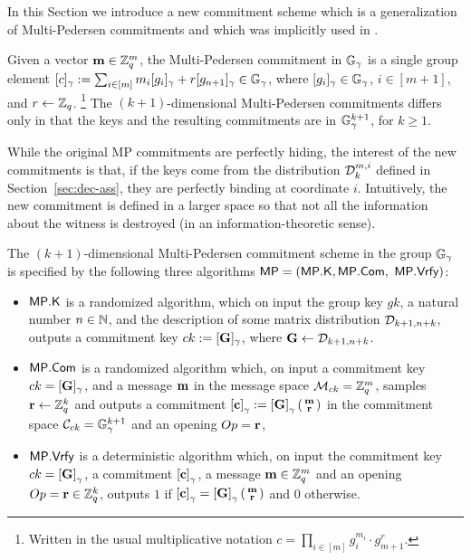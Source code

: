 In this Section we introduce a new commitment scheme which is a generalization of Multi-Pedersen commitments and which was implicitly used in \cite{AC:GonHevRaf15}. 

Given a vector $\mathbf{m}\in\mathbb{Z}_q^m$, the Multi-Pedersen commitment in $\mathbb{G}_{\gamma}$ is a single group element $[c]_\gamma:=\sum_{i\in [m]} m_i[g_i]_\gamma+r[g_{n+1}]_\gamma \in\mathbb{G}_\gamma$, where $[g_i]_{\gamma}\in\mathbb{G}_\gamma$, $i\in[m+1]$, and $r\gets\mathbb{Z}_q$. \footnote{Written in the usual multiplicative notation $c=\prod_{i\in[m]}g_i^{m_i} \cdot g_{m+1}^r$.}  The $(k+1)$-dimensional Multi-Pedersen commitments 
differs only in that the keys and the resulting commitments are in 
$\mathbb{G}_{\gamma}^{k+1}$, for $k\geq 1$. 


While the original MP commitments are perfectly hiding, the interest of the new commitments is that, if the keys come from the distribution $\mathcal{D}_k^{m,i}$ defined in Section~\ref{sec:dec-ass}, they are perfectly binding at coordinate $i$. Intuitively, the new commitment is defined in a larger space so that not all the information about the witness is destroyed (in an information-theoretic sense). 

\begin{definition} The $(k+1)$-dimensional Multi-Pedersen commitment scheme in the group $\mathbb{G}_\gamma$ 
is specified by the following three algorithms 
	$\mathsf{MP}=(\mathsf{MP}.\mathsf{K},\mathsf{MP}.\mathsf{Com},$ $ \mathsf{MP}.\mathsf{Vrfy})$:
	\begin{itemize} 
		\item  $\mathsf{MP}.\mathsf{K}$ is a randomized algorithm, which on input the group key $gk$, a natural number $n \in \mathbb{N}$, and the description of some matrix distribution $\mathcal{D}_{k+1,n+k}$, 
		outputs a commitment key $ck:=[\mathbf{{G}}]_\gamma$, where $\mathbf{{G}} \gets \mathcal{D}_{k+1,n+k}$.
		\item $\mathsf{MP}.\mathsf{Com}$ is a randomized algorithm which, on input a commitment key $ck=[\mathbf{{G}}]_\gamma$, and a message 
		$\mathbf{m}$ in the message space $\mathcal{M}_{ck}=\mathbb{Z}_q^{m}$, samples $\mathbf{r} \gets \mathbb{Z}_q^k$ and outputs a commitment $\left[\mathbf{c}\right]_\gamma:=\left[\mathbf{{G}}\right]_\gamma\left(\begin{smallmatrix}\mathbf{m} \\ \mathbf{r}\end{smallmatrix}\right)$ in the commitment space $\mathcal{C}_{ck}=\mathbb{G}_\gamma^{k+1}$ and an opening $Op=\mathbf{r}$, 
		\item $\mathsf{MP}.\mathsf{Vrfy}$ is a deterministic algorithm which, on input the commitment key $ck=\left[\mathbf{{G}}\right]_\gamma$, a commitment $\left[\mathbf{c}\right]_\gamma$,  a message 
		$\mathbf{m} \in \mathbb{Z}_q^{m}$ and an opening $Op=\mathbf{r}\in\mathbb{Z}_q^k$, outputs $1$ if $\left[\mathbf{c}\right]_\gamma=\left[\mathbf{{G}}\right]_\gamma\left(\begin{smallmatrix}\mathbf{m} \\ \mathbf{r}\end{smallmatrix}\right)$
		and $0$ otherwise. 
	\end{itemize}
\end{definition}

